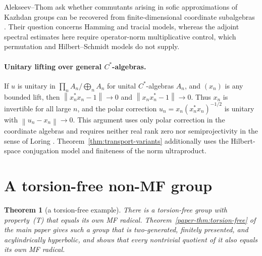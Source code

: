 \documentclass[11pt]{amsart}
\newtheorem{theorem}{Theorem}[section]
\theoremstyle{definition}
\theoremstyle{remark}
\theoremstyle{plain}
\newcommand{\opnorm}[1]{\left\lVert #1\right\rVert}
\begin{document}
Alekseev--Thom ask whether commutants arising in sofic approximations
of Kazhdan groups can be recovered from finite-dimensional coordinate
subalgebras \cite[Open Problem~6.2]{AlekseevThom}.  Their question
concerns Hamming and tracial models, whereas the adjoint spectral
estimates here require operator-norm multiplicative control, which
permutation and Hilbert--Schmidt models do not supply.

\paragraph{Unitary lifting over general $C^*$-algebras.}
If $u$ is unitary in
$\prod_nA_n/\bigoplus_nA_n$ for unital $C^*$-algebras $A_n$, and
$(x_n)$ is any bounded lift, then
$\opnorm{x_n^{*}x_n-1}\to0$ and $\opnorm{x_nx_n^{*}-1}\to0$.
Thus $x_n$ is invertible for all large $n$, and the polar correction
$u_n=x_n(x_n^{*}x_n)^{-1/2}$ is unitary with
$\opnorm{u_n-x_n}\to0$.  This argument uses only polar correction in the
coordinate algebras and requires neither real rank zero nor semiprojectivity
in the sense of Loring \cite{Loring98}.  Theorem~\ref{thm:transport-variants}
additionally uses the Hilbert-space conjugation model and finiteness of the
norm ultraproduct.

\section{A torsion-free non-MF group}
\label{sec:torsionfree}

\begin{theorem}[a torsion-free example]\label{thm:torsionfree}
There is a torsion-free group with property~\textup{(T)} that equals its
own MF radical.  Theorem~\ref{paper-thm:torsion-free} of the main paper
gives such a group that is two-generated, finitely presented, and
acylindrically hyperbolic, and shows that every nontrivial quotient of it
also equals its own MF radical.
\end{theorem}
\end{document}
